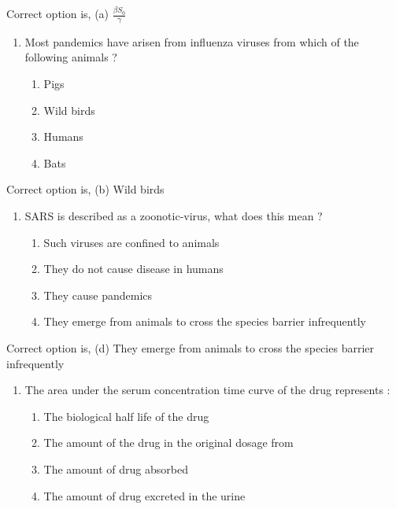 \documentclass[12pt,a4paper]{article}
\begin{document}
    Correct option is, (a)  $\frac{\beta S_0}{\gamma}$

    \vspace*{0.5cm}

    \begin{enumerate}[label=14.]
        \item Most pandemics have arisen from influenza viruses from which of the following animals ?
        \begin{enumerate}
            \item Pigs
            \item Wild birds
            \item Humans
            \item Bats
        \end{enumerate}
    \end{enumerate}

    Correct option is, (b) Wild birds

    \vspace*{0.5cm}

    \begin{enumerate}[label=15.]
        \item SARS is described as a zoonotic-virus, what does this mean ?
        \begin{enumerate}
            \item Such viruses are confined to animals
            \item They do not cause disease in humans
            \item They cause pandemics
            \item They emerge from animals to cross the species barrier infrequently
        \end{enumerate}
    \end{enumerate}

    Correct option is, (d) They emerge from animals to cross the species barrier infrequently

    \vspace*{0.5cm}

    \begin{enumerate}[label=16.]
        \item The area under the serum concentration time curve of the drug represents :
        \begin{enumerate}
            \item The biological half life of the drug
            \item The amount of the drug in the original dosage from
            \item The amount of drug absorbed
            \item The amount of drug excreted in the urine
        \end{enumerate}
    \end{enumerate}
\end{document}
